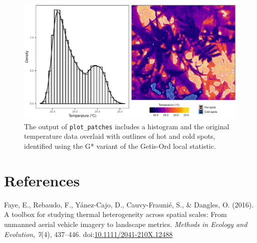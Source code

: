 \documentclass[12pt,british,a4paper,]{article}
\newenvironment{Shaded}{\begin{snugshade}}{\end{snugshade}}
\newcommand{\CommentTok}[1]{\textcolor[rgb]{0.56,0.35,0.01}{\textit{#1}}}
\newcommand{\DataTypeTok}[1]{\textcolor[rgb]{0.13,0.29,0.53}{#1}}
\newcommand{\FloatTok}[1]{\textcolor[rgb]{0.00,0.00,0.81}{#1}}
\newcommand{\KeywordTok}[1]{\textcolor[rgb]{0.13,0.29,0.53}{\textbf{#1}}}
\newcommand{\NormalTok}[1]{#1}
\newcommand{\OperatorTok}[1]{\textcolor[rgb]{0.81,0.36,0.00}{\textbf{#1}}}
\newcommand{\OtherTok}[1]{\textcolor[rgb]{0.56,0.35,0.01}{#1}}
\begin{document}
\begin{Shaded}
\end{Shaded}

\begin{figure}[H]

{\centering \includegraphics{./figures/som/fig-1-1} 

}

\caption{The output of \texttt{plot\_patches} includes a histogram and the original temperature data overlaid with outlines of hot and cold spots, identified using the G* variant of the Getis-Ord local statistic.}\label{fig:fig-1}
\end{figure}

\pagebreak

\hypertarget{references}{%
\section*{References}\label{references}}

\hypertarget{refs}{}
\leavevmode\hypertarget{ref-faye_toolbox_2016}{}%
Faye, E., Rebaudo, F., Yánez-Cajo, D., Cauvy-Fraunié, S., \& Dangles, O. (2016). A toolbox for studying thermal heterogeneity across spatial scales: From unmanned aerial vehicle imagery to landscape metrics. \emph{Methods in Ecology and Evolution}, \emph{7}(4), 437--446. doi:\href{https://doi.org/10.1111/2041-210X.12488}{10.1111/2041-210X.12488}
\end{document}

